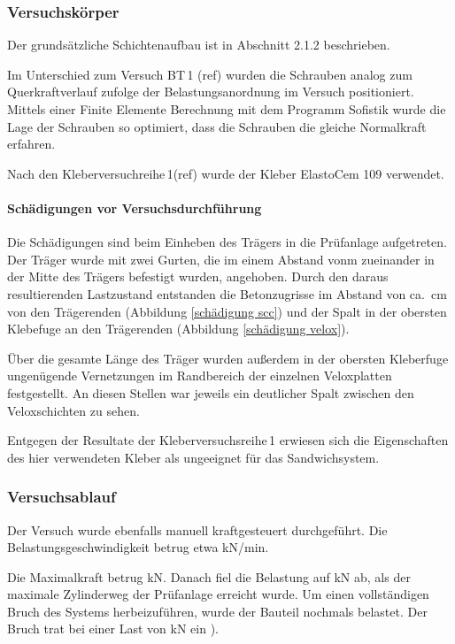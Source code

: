 \subsubsection{Versuchskörper}

Der grundsätzliche Schichtenaufbau ist in Abschnitt 2.1.2 beschrieben.

Im Unterschied zum Versuch BT\,1 (ref) wurden die Schrauben analog zum Querkraftverlauf zufolge der  Belastungsanordnung im Versuch positioniert. Mittels einer Finite Elemente Berechnung mit dem Programm Sofistik wurde die Lage der Schrauben so optimiert, dass die Schrauben die gleiche Normalkraft erfahren. 



Nach den Kleberversuchreihe\,1(ref) wurde der Kleber ElastoCem 109 verwendet.


\paragraph{Schädigungen vor Versuchsdurchführung}
\label{abs:BT2_Schaden}

Die Schädigungen sind beim Einheben des Trägers in die Prüfanlage aufgetreten. Der Träger wurde mit zwei Gurten, die im einem Abstand von\unit[3]{m} zueinander in der Mitte des Trägers befestigt wurden, angehoben. Durch den daraus resultierenden Lastzustand entstanden die Betonzugrisse im Abstand von ca.\ \unit[150]{cm} von den Trägerenden (Abbildung \ref{schädigung scc}) und der Spalt in der obersten Klebefuge an den Trägerenden (Abbildung \ref{schädigung velox}).

Über die gesamte Länge des Träger wurden außerdem in der obersten Kleberfuge ungenügende Vernetzungen im Randbereich der einzelnen Veloxplatten festgestellt. An diesen Stellen war jeweils ein deutlicher Spalt zwischen den Veloxschichten zu sehen. 

Entgegen der Resultate der Kleberversuchsreihe\,1 erwiesen sich die Eigenschaften des hier verwendeten Kleber als ungeeignet für das Sandwichsystem. 



\subsubsection{Versuchsablauf}

Der Versuch wurde ebenfalls manuell kraftgesteuert durchgeführt. 
Die Belastungsgeschwindigkeit betrug etwa \unit[4]{kN/min}.  

Die Maximalkraft betrug \unit[31]{kN}. Danach fiel die Belastung auf \unit[18]{kN} ab, als der maximale Zylinderweg der Prüfanlage erreicht wurde.
Um einen vollständigen Bruch des Systems herbeizuführen, wurde der Bauteil nochmals belastet. Der Bruch trat bei einer Last von \unit[21]{kN} ein ).



